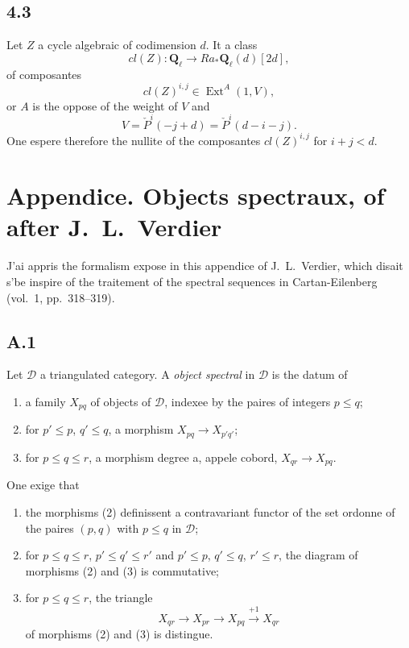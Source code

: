 \documentclass[11pt,a4paper]{article}
\theoremstyle{plain}
\theoremstyle{definition}
\DeclareMathOperator{\Ext}{Ext}
\newcommand{\cD}{\mathscr{D}}
\newcommand{\bQ}{\mathbf{Q}}
\begin{document}
\subsection*{4.3}
Let $Z$ a cycle algebraic of codimension $d$. It a class
\[
cl(Z) \colon \bQ_\ell \to Ra_* \bQ_\ell(d)[2d],
\]
of composantes
\[
cl(Z)^{i,j} \in \Ext^A(1, V),
\]
or $A$ is the oppose of the weight of $V$ and
\[
V = \check{P}^i(-j+d) = \check{P}^i(d-i-j).
\]
One espere therefore the nullite of the composantes $cl(Z)^{i,j}$ for $i+j < d$.

\appendix
\section*{Appendice. Objects spectraux, of after J.~L.~Verdier}

J'ai appris the formalism expose in this appendice of J.~L.~Verdier, which disait s'be inspire of the traitement of the spectral sequences in Cartan-Eilenberg (vol.~1, pp.~318--319).

\subsection*{A.1}
Let $\cD$ a triangulated category. A \emph{object spectral} in $\cD$ is the datum of
\begin{enumerate}[label=(\arabic*)]
\item a family $X_{pq}$ of objects of $\cD$, indexee by the paires of integers $p \leqslant q$;
\item for $p' \leqslant p$, $q' \leqslant q$, a morphism $X_{pq} \to X_{p'q'}$;
\item for $p \leqslant q \leqslant r$, a morphism degree a, appele cobord, $X_{qr} \to X_{pq}$.
\end{enumerate}
One exige that
\begin{enumerate}[label=(\alph*)]
\item the morphisms (2) definissent a contravariant functor of the set ordonne of the paires $(p,q)$ with $p \leqslant q$ in $\cD$;
\item for $p \leqslant q \leqslant r$, $p' \leqslant q' \leqslant r'$ and $p' \leqslant p$, $q' \leqslant q$, $r' \leqslant r$, the diagram of morphisms (2) and (3) is commutative;
\item for $p \leqslant q \leqslant r$, the triangle
\[
X_{qr} \to X_{pr} \to X_{pq} \xrightarrow{+1} X_{qr}
\]
of morphisms (2) and (3) is distingue.
\end{enumerate}
\end{document}
